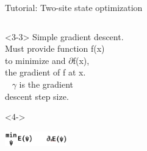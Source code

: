 \begin{frame}[fragile]{Tutorial: Two-site state optimization}
\begin{columns}
\begin{column}{5cm}
\begin{onlyenv}<3-3>
Simple gradient descent. \\
Must provide function f(x) \\
to minimize and $\partial$f(x), \\
the gradient of f at x. \\
~
$\gamma$ is the gradient \\
descent step size. \\
\end{onlyenv}

\begin{onlyenv}<4->
\vspace*{0.0cm}
\begin{center}
\includegraphics[width=0.2\textwidth]{
  slides/assets/min_grad_E_psi.png
}
\end{center}
\vspace*{0.0cm}
\end{onlyenv}

\end{column}

\end{columns}

\end{frame}

